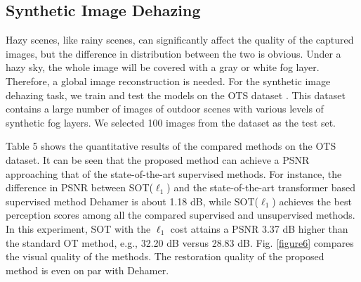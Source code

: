 \documentclass[10pt,journal,compsoc]{IEEEtran}
\begin{document}
\subsection{Synthetic Image Dehazing}

Hazy scenes, like rainy scenes, can significantly 
affect the quality of the captured images, but the 
difference in distribution between the two is obvious. 
Under a hazy sky, the whole image will be 
covered with a gray or white fog layer. Therefore, 
a global image reconstruction is needed. 
For the synthetic image dehazing task, we train and test
the models on the OTS dataset \cite{li2018benchmarking}. 
This dataset contains a large number of images of outdoor 
scenes with various levels of synthetic fog layers. We 
selected 100 images from the dataset as the test set.

Table 5 shows the quantitative results of the compared 
methods on the OTS dataset. It can be seen that the proposed 
method can achieve a PSNR approaching that of the 
state-of-the-art supervised methods.
For instance, the difference in PSNR between SOT($\ell_{1}$) 
and the state-of-the-art transformer based supervised method Dehamer is about 1.18 dB, while SOT($\ell_{1}$) achieves 
the best perception scores among all the compared 
supervised and unsupervised methods.
In this experiment, SOT with the $\ell_1$ cost attains a 
PSNR 3.37 dB higher than the standard OT method, e.g.,
32.20 dB versus 28.83 dB.
Fig. \ref{figure6} compares the visual quality of the methods. 
The restoration quality of the proposed method is even  
on par with Dehamer.
\end{document}
